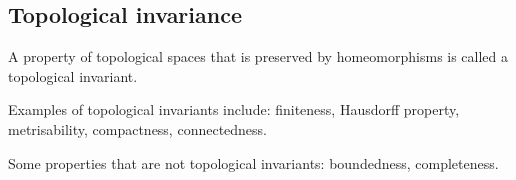 \subsection{Topological invariance}
\begin{ndfn}
  A property of topological spaces that is preserved by homeomorphisms is called a topological invariant.
\end{ndfn}

Examples of topological invariants include: finiteness, Hausdorff property, metrisability, compactness, connectedness.

Some properties that are not topological invariants: boundedness, completeness.